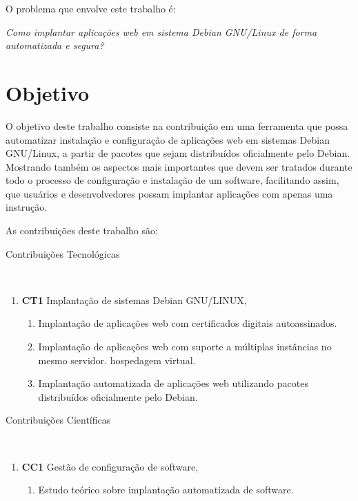 O problema que envolve este trabalho é:

\begin{center}
  \textit{
  Como implantar aplicações web em sistema Debian GNU/Linux de forma automatizada
  e segura?
}
\end{center}

\section{Objetivo}

O objetivo deste trabalho consiste na contribuição em uma ferramenta
que possa automatizar instalação e configuração de aplicações web em sistemas
Debian GNU/Linux, a partir de pacotes que sejam distribuídos oficialmente pelo
Debian. Mostrando também os aspectos mais importantes que devem ser tratados durante
todo o processo de configuração e instalação de um software, facilitando assim, que usuários e desenvolvedores possam implantar aplicações com apenas uma
instrução.

As contribuições deste trabalho são:

\begin{description}
  \item [Contribuições Tecnológicas]\
\end{description}
    \begin{enumerate}
      \item \textbf{CT1} Implantação de sistemas Debian GNU/LINUX,
        \begin{enumerate}
          \item Implantação de aplicações web com certificados digitais autoassinados.
          \item Implantação de aplicações web com suporte a múltiplas instâncias no mesmo servidor.
          hospedagem virtual.
						\item Implantação automatizada de aplicações web utilizando pacotes
          distribuídos oficialmente pelo Debian.
        \end{enumerate}
    \end{enumerate}

\begin{description}
  \item [Contribuições Científicas]\
\end{description}
    \begin{enumerate}
      \item \textbf{CC1} Gestão de configuração de software,
        \begin{enumerate}
          \item Estudo teórico sobre implantação automatizada de software.
        \end{enumerate}
    \end{enumerate}



